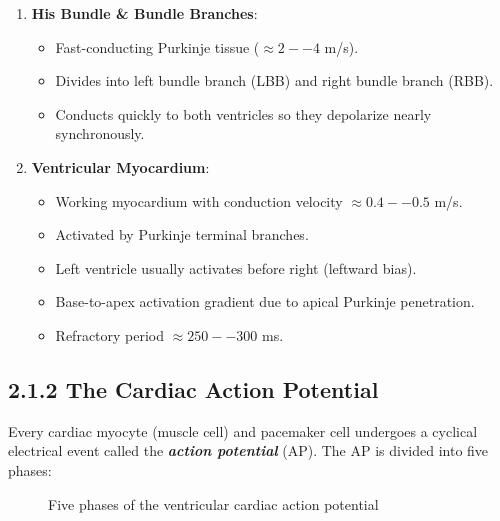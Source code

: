 \documentclass[12pt,oneside,a4paper]{book}
\newcommand{\concept}[1]{\textbf{\emph{#1}}}
\begin{document}
\begin{enumerate}
  \item \textbf{His Bundle \& Bundle Branches}:
    \begin{itemize}
      \item Fast-conducting Purkinje tissue ($\approx 2 -- 4$ m/s).
      \item Divides into left bundle branch (LBB) and right bundle branch (RBB).
      \item Conducts quickly to both ventricles so they depolarize nearly synchronously.
    \end{itemize}

  \item \textbf{Ventricular Myocardium}:
    \begin{itemize}
      \item Working myocardium with conduction velocity $\approx 0.4 -- 0.5$ m/s.
      \item Activated by Purkinje terminal branches.
      \item Left ventricle usually activates before right (leftward bias).
      \item Base-to-apex activation gradient due to apical Purkinje penetration.
      \item Refractory period $\approx 250 -- 300$ ms.
    \end{itemize}
\end{enumerate}

\subsection{2.1.2 The Cardiac Action Potential}

Every cardiac myocyte (muscle cell) and pacemaker cell undergoes a cyclical electrical event called the \concept{action potential} (AP). The AP is divided into five phases:

\begin{figure}[H]
\centering
{}
\caption{Five phases of the ventricular cardiac action potential}
\label{fig:ap_phases}
\end{figure}
\end{document}
